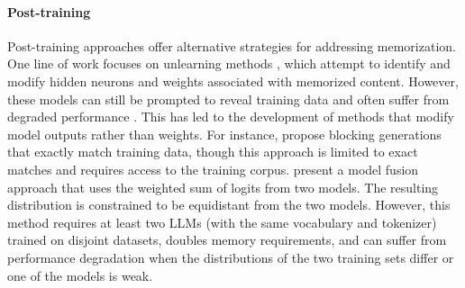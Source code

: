 \paragraph{Post-training}
Post-training approaches offer alternative strategies for addressing memorization. One line of work focuses on unlearning methods \citep{maini2023can, jang2022knowledge, sakarvadia2024mitigating}, which attempt to identify and modify hidden neurons and weights associated with memorized content. However, these models can still be prompted to reveal training data \citep{shumailov2024ununlearning} and often suffer from degraded performance \citep{huang2024demystifyingverbatimmemorizationlarge}. This has led to the development of methods that modify model outputs rather than weights. For instance, \citet{ippolito2022preventing} propose blocking generations that exactly match training data, though this approach is limited to exact matches and requires access to the training corpus. \citet{abad2024copyright} present a model fusion approach that uses the weighted sum of logits from two models. The resulting distribution is constrained to be equidistant from the two models. However, this method requires at least two LLMs (with the same vocabulary and tokenizer) trained on disjoint datasets, doubles memory requirements, and can suffer from performance degradation when the distributions of the two training sets differ or one of the models is weak.

